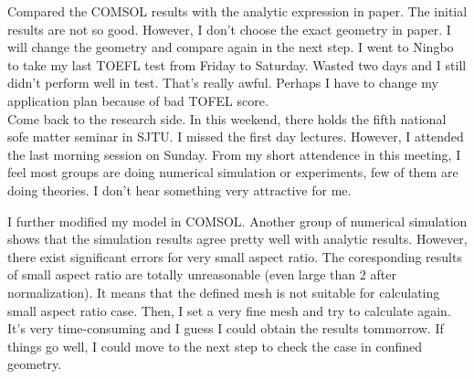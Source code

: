 \documentclass[fontsize=11pt, %
                             paper=a4, %
                             twoside, %
                             captions=tableheading,
                             index=totoc,
                             hyperref]{labbook}
\begin{document}
\begin{addmargin}[4cm]{0cm}
Compared the COMSOL results with the analytic expression in paper\cite{Nourhani2016}. The initial results are not so good. However, I don't choose the exact geometry in paper\cite{Nourhani2016}. I will change the geometry and compare again in the next step.
I went to Ningbo to take my last TOEFL test from Friday to Saturday. Wasted two days and I still didn't perform well in test. That's really awful. Perhaps I have to change my application plan because of bad TOFEL score.\\
Come back to the research side. In this weekend, there holds the fifth national sofe matter seminar in SJTU. I missed the first day lectures. However, I attended the last morning session on Sunday. From my short attendence in this meeting, I feel most groups are doing numerical simulation or experiments, few of them are doing theories. I don't hear something very attractive for me.

I further modified my model in COMSOL. Another group of numerical simulation shows that the simulation results agree pretty well with analytic results. However, there exist significant errors for very small aspect ratio. The coresponding results of small aspect ratio are totally unreasonable (even large than 2 after normalization). It means that the defined mesh is not suitable for calculating small aspect ratio case. Then, I set a very fine mesh and try to calculate again. It's very time-consuming and I guess I could obtain the results tommorrow. If things go well, I could move to the next step to check the case in confined geometry.


\end{addmargin}
\end{document}

